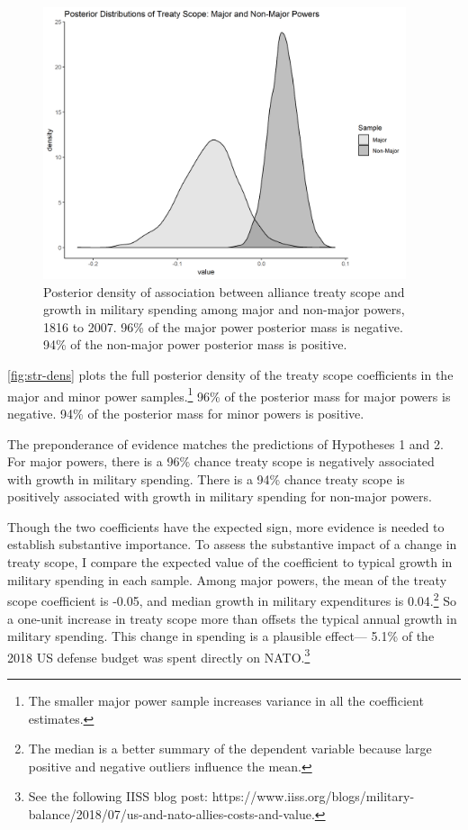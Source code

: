 \documentclass[12pt]{article}
\begin{document}
\begin{figure}[htbp]
	\centering
		\includegraphics[width=0.95\textwidth]{../figures/scope-dens-split.png}
	\caption{Posterior density of association between alliance treaty scope and growth in military spending among major and non-major powers, 1816 to 2007. 96\% of the major power posterior mass is negative. 94\% of the non-major power posterior mass is positive.}
	\label{fig:str-dens}
\end{figure}


\autoref{fig:str-dens} plots the full posterior density of the treaty scope coefficients in the major and minor power samples.\footnote{The smaller major power sample increases variance in all the coefficient estimates.} 
96\% of the posterior mass for major powers is negative. 
94\% of the posterior mass for minor powers is positive. 


The preponderance of evidence matches the predictions of Hypotheses 1 and 2. 
For major powers, there is a 96\% chance treaty scope is negatively associated with growth in military spending. 
There is a 94\% chance treaty scope is positively associated with growth in military spending for non-major powers.


Though the two coefficients have the expected sign, more evidence is needed to establish substantive importance. 
To assess the substantive impact of a change in treaty scope, I compare the expected value of the coefficient to typical growth in military spending in each sample. 
Among major powers, the mean of the treaty scope coefficient is -0.05, and median growth in military expenditures is 0.04.\footnote{The median is a better summary of the dependent variable because large positive and negative outliers influence the mean.} 
So a one-unit increase in treaty scope more than offsets the typical annual growth in military spending. 
This change in spending is a plausible effect--- 5.1\% of the 2018 US defense budget was spent directly on NATO.\footnote{See the following IISS blog post: https://www.iiss.org/blogs/military-balance/2018/07/us-and-nato-allies-costs-and-value.} 
\end{document}
